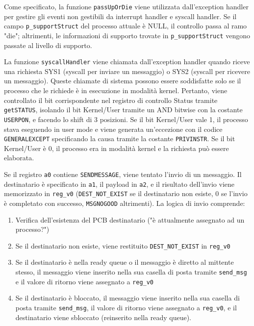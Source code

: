 \documentclass[a4paper]{article}
\begin{document}
Come specificato, la funzione \verb+passUpOrDie+ viene utilizzata dall'exception handler per gestire gli eventi non gestibili da interrupt handler e syscall handler. Se il campo \verb+p_supportStruct+ del processo attuale è NULL, il controllo passa al ramo "die"; altrimenti, le informazioni di supporto trovate in \verb+p_supportStruct+ vengono passate al livello di supporto.

La funzione \verb+syscallHandler+ viene chiamata dall'exception handler quando riceve una richiesta SYS1 (syscall per inviare un messaggio) o SYS2 (syscall per ricevere un messaggio). Queste chiamate di sistema possono essere soddisfatte solo se il processo che le richiede è in esecuzione in modalità kernel. Pertanto, viene controllato il bit corrispondente nel registro di controllo Status tramite \verb+getSTATUS+, isolando il bit Kernel/User tramite un AND bitwise con la costante \verb+USERPON+, e facendo lo shift di 3 posizioni. Se il bit Kernel/User vale 1, il processo stava eseguendo in user mode e viene generata un'eccezione con il codice \verb+GENERALEXCEPT+ specificando la causa tramite la costante \verb+PRIVINSTR+. Se il bit Kernel/User è 0, il processo era in modalità kernel e la richiesta può essere elaborata.

Se il registro \verb+a0+ contiene \verb+SENDMESSAGE+, viene tentato l'invio di un messaggio. Il destinatario è specificato in \verb+a1+, il payload in \verb+a2+, e il risultato dell'invio viene memorizzato in \verb+reg_v0+ (\verb+DEST_NOT_EXIST+ se il destinatario non esiste, 0 se l'invio è completato con successo, \verb+MSGNOGOOD+ altrimenti). La logica di invio comprende:
\begin{enumerate}
\item Verifica dell'esistenza del PCB destinatario ("è attualmente assegnato ad un processo?")
\item Se il destinatario non esiste, viene restituito \verb+DEST_NOT_EXIST+ in \verb+reg_v0+
\item Se il destinatario è nella ready queue o il messaggio è diretto al mittente stesso, il messaggio viene inserito nella sua casella di posta tramite \verb+send_msg+ e il valore di ritorno viene assegnato a \verb+reg_v0+
\item Se il destinatario è bloccato, il messaggio viene inserito nella sua casella di posta tramite \verb+send_msg+, il valore di ritorno viene assegnato a \verb+reg_v0+, e il destinatario viene sbloccato (reinserito nella ready queue).
\end{enumerate}
\end{document}
